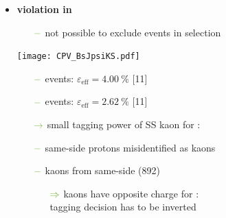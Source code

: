 {\begin{minipage}{0.474\boxwidth}
\begin{itemize}
\vspace{-0.1em}
\item\textbf{\CP violation in \BsToJPsiKS}
	\begin{itemize}
	\setlength\itemsep{0.01em}
	\setlength{\itemindent}{-.11in}
	\item[${\color{tu_gruen}-}$] not possible to exclude \Bd events in selection
	\end{itemize}
	
\vspace{-2.1em}
\begin{flushleft}
\texttt{[image: CPV\_BsJpsiKS.pdf]}
\end{flushleft}
\vspace{-2.2em}

	\begin{itemize}
	\setlength\itemsep{0.01em}
	\setlength{\itemindent}{-.11in}
	\item[${\color{tu_gruen}-}$] \Bs events: $\varepsilon_\text{eff}=\SI{4.00}{\%}$ [11]
	\item[${\color{tu_gruen}-}$] \Bd events: $\varepsilon_\text{eff}=\SI{2.62}{\%}$ [11]
	\setlength{\itemindent}{.05in}
	\item[${\color{tu_gruen}\rightarrow}$] small tagging power of SS kaon for \Bd:
	\setlength{\itemindent}{.10in}
	\item[${\color{tu_gruen}-}$] same-side protons misidentified as kaons
	\item[${\color{tu_gruen}-}$] kaons from same-side \Kstar(892)
	\vspace{-0.35em}
		\begin{itemize}[leftmargin=.05in]
		\item[${\color{tu_gruen}\Rightarrow}$] kaons have opposite charge for \Bd:\\ tagging decision has to be inverted
		\end{itemize}
	\end{itemize}


%
%
\end{itemize}


\end{minipage}}
